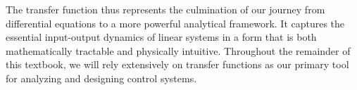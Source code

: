 The transfer function thus represents the culmination of our journey from differential equations to a more powerful analytical framework. It captures the essential input-output dynamics of linear systems in a form that is both mathematically tractable and physically intuitive. Throughout the remainder of this textbook, we will rely extensively on transfer functions as our primary tool for analyzing and designing control systems.
